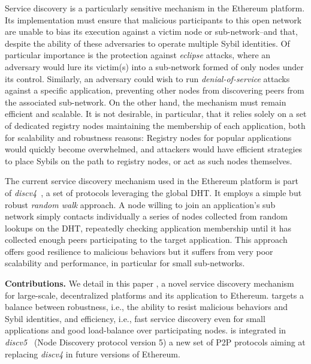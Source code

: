 Service discovery is a particularly sensitive mechanism in the Ethereum platform.
Its implementation must ensure that malicious participants to this open network are unable to bias its execution against a victim node or sub-network--and that, despite the ability of these adversaries to operate multiple Sybil identities.
Of particular importance is the protection against \emph{eclipse} attacks, where an adversary would lure its victim(s) into a sub-network formed of only nodes under its control. %
Similarly, an adversary could wish to run \emph{denial-of-service} attacks against a specific application, preventing other nodes from discovering peers from the associated sub-network.
On the other hand, the mechanism must remain efficient and scalable.
It is not desirable, in particular, that it relies solely on a set of dedicated registry nodes maintaining the membership of each application, both for scalability and robustness reasons: Registry nodes for popular applications would quickly become overwhelmed, and attackers would have efficient strategies to place Sybils on the path to registry nodes, or act as such nodes themselves.

The current service discovery mechanism used in the Ethe\-reum platform is part of \emph{discv4}~\cite{discv4}, a set of protocols leveraging the global DHT.
It employs a simple but robust \emph{random walk} approach.
A node willing to join an application's sub network simply contacts individually a series of nodes collected from random lookups on the DHT, repeatedly checking application membership until it has collected enough peers participating to the target application. %
This approach offers good resilience to malicious behaviors
but it suffers from very poor scalability and performance, in particular for small sub-networks.

\smallskip
\noindent
\textbf{Contributions.}
%
We detail in this paper \sysname, a novel service discovery mechanism for large-scale, decentralized platforms and its application to Ethereum.
\sysname targets a balance between robustness, i.e., the ability to resist malicious behaviors and Sybil identities, and efficiency, i.e., fast service discovery even for small applications and good load-balance over participating nodes.
\sysname is integrated in \emph{discv5}~\cite{discv5} (Node Discovery protocol version 5) a new set of P2P protocols aiming at replacing \emph{discv4} in future versions of Ethereum. 

